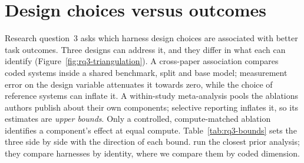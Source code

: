 
\section{Design choices versus outcomes}\label{sec:outcomes}

Research question~3 asks which harness design choices are associated with better task outcomes.
Three designs can address it, and they differ in what each can identify
(Figure~\ref{fig:rq3-triangulation}). A cross-paper association compares coded systems inside a shared
benchmark, split and base model; measurement error on the design variable attenuates it towards zero,
while the choice of reference systems can inflate it. A within-study meta-analysis pools the ablations
authors publish about their own components; selective reporting inflates it, so its estimates are
\emph{upper bounds}. Only a controlled, compute-matched ablation identifies a component's effect at
equal compute. Table~\ref{tab:rq3-bounds} sets the three side by side with the direction of each
bound. \citet{guo2026qa2task} run the closest prior
analysis; they compare harnesses by identity, where we compare them by coded dimension.

